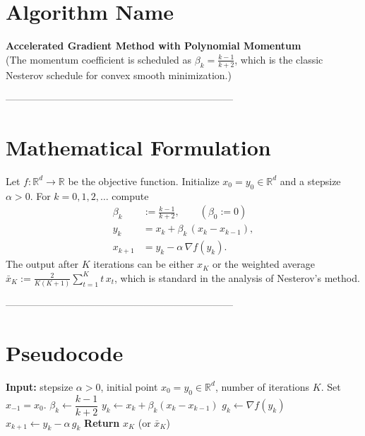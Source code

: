 \documentclass{article}
\newcommand{\grad}{\nabla}
\begin{document}
\section*{Algorithm Name}
\textbf{Accelerated Gradient Method with Polynomial Momentum}\\
(The momentum coefficient is scheduled as $\displaystyle \beta_k=\frac{k-1}{k+2}$, which is the classic Nesterov schedule for convex smooth minimization.)

---------------------------------------------------------------------

\section*{Mathematical Formulation}
Let $f:\mathbb{R}^d\rightarrow\mathbb{R}$ be the objective function.  
Initialize $x_{0}=y_{0}\in\mathbb{R}^d$ and a stepsize $\alpha>0$.  
For $k=0,1,2,\dots$ compute
\begin{align}
    \beta_k &:= \frac{k-1}{k+2},\qquad (\beta_0:=0) \tag{1}\\[2mm]
    y_k &= x_k + \beta_k\,(x_k-x_{k-1}) , \tag{2}\\[2mm]
    x_{k+1} &= y_k - \alpha\,\grad f(y_k). \tag{3}
\end{align}
The output after $K$ iterations can be either $x_K$ or the weighted average $\bar x_K:=\frac{2}{K(K+1)}\sum_{t=1}^{K} t\,x_t$, which is standard in the analysis of Nesterov’s method.

---------------------------------------------------------------------

\section*{Pseudocode}
\begin{algorithm}[H]
\caption{Accelerated Gradient with $\beta_k=\frac{k-1}{k+2}$}
\begin{algorithmic}[1]
\State \textbf{Input:} stepsize $\alpha>0$, initial point $x_{0}=y_{0}\in\mathbb{R}^d$, number of iterations $K$.
\State Set $x_{-1}=x_{0}$.
    \State $\beta_k \gets \dfrac{k-1}{k+2}$ 
    \State $y_k \gets x_k + \beta_k (x_k - x_{k-1})$ 
    \State $g_k \gets \grad f(y_k)$
    \State $x_{k+1} \gets y_k - \alpha\, g_k$ 
\EndFor
\State \textbf{Return} $x_{K}$ (or $\bar x_K$)
\end{algorithmic}
\end{algorithm}
\end{document}
